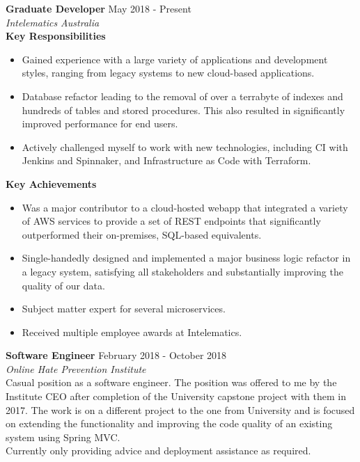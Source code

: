 \documentclass[margin, 11pt]{res} %
\begin{document}
\begin{resume}
\textbf{Graduate Developer} \hfill May 2018 - Present \\
{\sl Intelematics Australia}
\vspace{15pt}\\
\textbf{Key Responsibilities}

\begin{itemize}
\item Gained experience with a large variety of applications and development styles, ranging from legacy systems to new cloud-based applications.
\item Database refactor leading to the removal of over a terrabyte of indexes and hundreds of tables and stored procedures. This also resulted in significantly improved performance for end users.
\item Actively challenged myself to work with new technologies, including CI with Jenkins and Spinnaker, and Infrastructure as Code with Terraform.

\end{itemize} 

\textbf{Key Achievements}

\begin{itemize}

\item Was a major contributor to a cloud-hosted webapp that integrated a variety of AWS services to provide a set of REST endpoints that significantly outperformed their on-premises, SQL-based equivalents.
\item Single-handedly designed and implemented a major business logic refactor in a legacy system, satisfying all stakeholders and substantially improving the quality of our data. 
\item Subject matter expert for several microservices.
\item Received multiple employee awards at Intelematics.


\end{itemize}


\textbf{Software Engineer} \hfill February 2018 - October 2018 \\
{\sl Online Hate Prevention Institute}
\vspace{15pt}\\
Casual position as a software engineer. The position was offered to me by the Institute CEO after completion of the University capstone project with them in 2017. The work is on a different project to the one from University and is focused on extending the functionality and improving the code quality of an existing system using Spring MVC. \\
Currently only providing advice and deployment assistance as required.





\end{resume}
\end{document}
